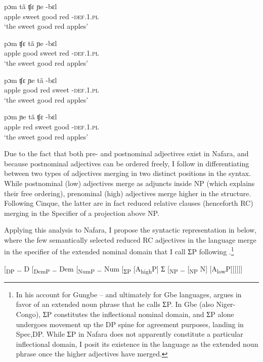 \documentclass[output=paper]{langscibook}
\begin{document}
\pagebreak
\ea\label{ex:baron:12}
\begin{multicols}{2}
\ea\gll pɔm     tã   ʧɛ     ɲe    -bɛl\\
apple    sweet   good    red    -\textsc{def.1.pl}\\
\glt ‘the sweet good red apples’

\ex\gll   pɔm     ʧɛ   tã     ɲe    -bɛl\\
apple    good  sweet     red    -\textsc{def.1.pl}\\
\glt ‘the sweet good red apples’

\ex\gll   pɔm     ʧɛ   ɲe    tã     -bɛl\\
apple    good  red    sweet     -\textsc{def.1.pl}\\
\glt ‘the sweet good red apples’

\ex\gll   pɔm     ɲe  tã     ʧɛ     -bɛl\\
apple    red  sweet     good    -\textsc{def.1.pl}\\
\glt ‘the sweet good red apples’
\z
\end{multicols}
\z

Due to the fact that both pre- and postnominal adjectives exist in Nafara, and because postnominal adjectives can be ordered freely, I follow \citet{Cinque2010} in differentiating between two types of adjectives merging in two distinct positions in the syntax. While postnominal (low) adjectives merge as adjuncts inside NP (which explains their free ordering), prenominal (high) adjectives merge higher in the structure. Following Cinque, the latter are in fact reduced relative clauses (henceforth RC) merging in the Specifier of a projection above NP.

Applying this analysis to Nafara, I propose the syntactic representation in  below, where the few semantically selected reduced RC adjectives in the language merge in the specifier of the extended nominal domain that I call ƩP following \citet{Aboh2004}.\footnote{In his account for Gungbe – and ultimately for Gbe languages, \citet{Aboh2004} argues in favor of an extended noun phrase that he calls ƩP. In Gbe (also Niger-Congo), ƩP constitutes the inflectional nominal domain, and ƩP alone undergoes movement up the DP spine for agreement purposes, landing in Spec,DP. While ƩP in Nafara does not apparently constitute a particular inflectional domain, I posit its existence in the language as the extended noun phrase once the higher adjectives have merged.}

\ea\label{ex:baron:13}
[\textsubscript{DP} … D [\textsubscript{DemP} … Dem [\textsubscript{NumP} … Num [\textsubscript{ƩP} [A\textsubscript{high}P] Ʃ [\textsubscript{NP} … [\textsubscript{NP} N] [A\textsubscript{low}P]]]]]]
\z
\end{document}

